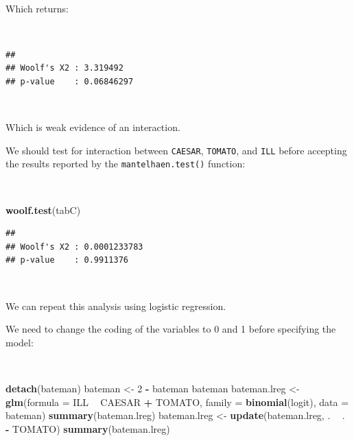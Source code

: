 \documentclass[12pt,a4paper]{book}
\newenvironment{Shaded}{\begin{snugshade}}{\end{snugshade}}
\newcommand{\KeywordTok}[1]{\textcolor[rgb]{0.13,0.29,0.53}{\textbf{#1}}}
\newcommand{\DataTypeTok}[1]{\textcolor[rgb]{0.13,0.29,0.53}{#1}}
\newcommand{\DecValTok}[1]{\textcolor[rgb]{0.00,0.00,0.81}{#1}}
\newcommand{\StringTok}[1]{\textcolor[rgb]{0.31,0.60,0.02}{#1}}
\newcommand{\OperatorTok}[1]{\textcolor[rgb]{0.81,0.36,0.00}{\textbf{#1}}}
\newcommand{\NormalTok}[1]{#1}
\theoremstyle{definition}
\theoremstyle{definition}
\theoremstyle{definition}
\theoremstyle{remark}
\begin{document}
~

Which returns:

~

\begin{verbatim}
## 
## Woolf's X2 : 3.319492 
## p-value    : 0.06846297
\end{verbatim}

~

Which is weak evidence of an interaction.

We should test for interaction between \texttt{CAESAR}, \texttt{TOMATO},
and \texttt{ILL} before accepting the results reported by the
\texttt{mantelhaen.test()} function:

~

\begin{Shaded}
\begin{Highlighting}[]
\KeywordTok{woolf.test}\NormalTok{(tabC)}
\end{Highlighting}
\end{Shaded}

\begin{verbatim}
## 
## Woolf's X2 : 0.0001233783 
## p-value    : 0.9911376
\end{verbatim}

~

We can repeat this analysis using logistic regression.

\newpage

We need to change the coding of the variables to 0 and 1 before
specifying the model:

~

\begin{Shaded}
\begin{Highlighting}[]
\KeywordTok{detach}\NormalTok{(bateman)}
\NormalTok{bateman <-}\StringTok{ }\DecValTok{2} \OperatorTok{-}\StringTok{ }\NormalTok{bateman}
\NormalTok{bateman}
\NormalTok{bateman.lreg <-}\StringTok{ }\KeywordTok{glm}\NormalTok{(}\DataTypeTok{formula =}\NormalTok{ ILL }\OperatorTok{~}\StringTok{ }\NormalTok{CAESAR }\OperatorTok{+}\StringTok{ }\NormalTok{TOMATO,}
                    \DataTypeTok{family =} \KeywordTok{binomial}\NormalTok{(logit), }\DataTypeTok{data =}\NormalTok{ bateman)}
\KeywordTok{summary}\NormalTok{(bateman.lreg)}
\NormalTok{bateman.lreg <-}\StringTok{ }\KeywordTok{update}\NormalTok{(bateman.lreg, . }\OperatorTok{~}\StringTok{ }\NormalTok{. }\OperatorTok{-}\StringTok{ }\NormalTok{TOMATO)}
\KeywordTok{summary}\NormalTok{(bateman.lreg)}
\end{Highlighting}
\end{Shaded}
\end{document}
